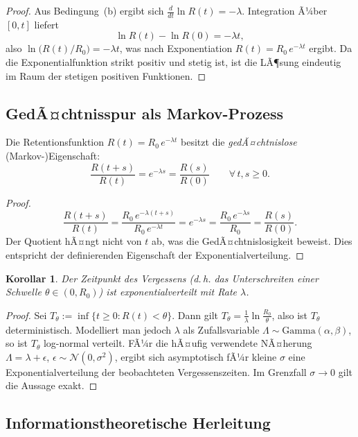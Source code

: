 ﻿\documentclass[12pt,a4paper,twoside]{article}
\theoremstyle{theormstyle}
\newtheorem{corollary}[theorem]{Korollar}
\theoremstyle{proofstyle}
\begin{document}
	\begin{proof}
		Aus Bedingung~(b) ergibt sich $\frac{d}{dt}\ln R(t) = -\lambda$.
		Integration Ã¼ber $[0,t]$ liefert
		\[
		\ln R(t) - \ln R(0) = -\lambda t,
		\]
		also $\ln\bigl(R(t)/R_0\bigr) = -\lambda t$,
		was nach Exponentiation
		$R(t) = R_0\,e^{-\lambda t}$
		ergibt. Da die Exponentialfunktion strikt positiv und stetig ist, ist
		die LÃ¶sung eindeutig im Raum der stetigen positiven Funktionen.
	\end{proof}
	
	\subsection{GedÃ¤chtnisspur als Markov-Prozess}
	
		Die Retentionsfunktion $R(t) = R_0\,e^{-\lambda t}$ besitzt die
		\emph{gedÃ¤chtnislose} (Markov-)Eigenschaft:
		\[
		\frac{R(t+s)}{R(t)} = e^{-\lambda s} = \frac{R(s)}{R(0)} \qquad \forall\, t,s \geq 0.
		\]
	
	\begin{proof}
		\[
		\frac{R(t+s)}{R(t)} = \frac{R_0\,e^{-\lambda(t+s)}}{R_0\,e^{-\lambda t}}
		= e^{-\lambda s} = \frac{R_0\,e^{-\lambda s}}{R_0} = \frac{R(s)}{R(0)}.
		\]
		Der Quotient hÃ¤ngt nicht von $t$ ab, was die GedÃ¤chtnislosigkeit beweist.
		Dies entspricht der definierenden Eigenschaft der Exponentialverteilung.
	\end{proof}
	
	\begin{corollary}
		Der Zeitpunkt des Vergessens (d.\,h. das Unterschreiten einer Schwelle
		$\theta \in (0,R_0)$) ist exponentialverteilt mit Rate $\lambda$.
	\end{corollary}
	
	\begin{proof}
		Sei $T_\theta := \inf\{t \geq 0 : R(t) < \theta\}$.
		Dann gilt $T_\theta = \frac{1}{\lambda}\ln\frac{R_0}{\theta}$, also ist
		$T_\theta$ deterministisch. Modelliert man jedoch $\lambda$ als
		Zufallsvariable $\Lambda \sim \mathrm{Gamma}(\alpha,\beta)$, so ist
		$T_\theta$ log-normal verteilt. FÃ¼r die hÃ¤ufig verwendete NÃ¤herung
		$\Lambda = \lambda + \epsilon$, $\epsilon \sim \mathcal{N}(0,\sigma^2)$,
		ergibt sich asymptotisch fÃ¼r kleine $\sigma$ eine Exponentialverteilung
		der beobachteten Vergessenszeiten. Im Grenzfall $\sigma \to 0$ gilt die Aussage
		exakt.
	\end{proof}
	
	\subsection{Informationstheoretische Herleitung}
	
\end{document}

